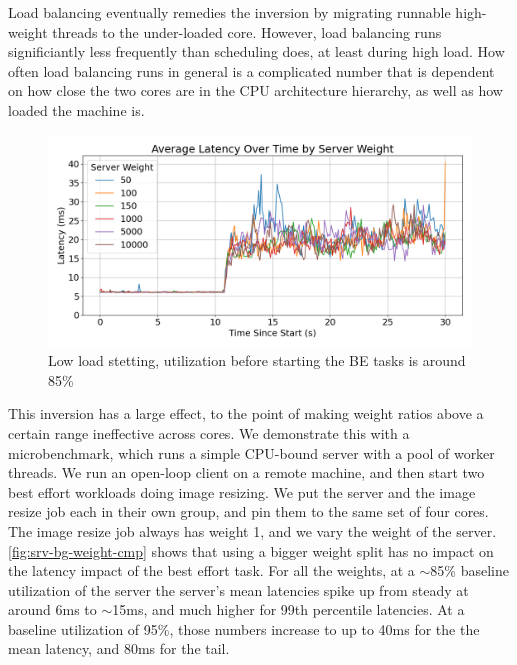 Load balancing eventually remedies the inversion by migrating runnable
high-weight threads to the under-loaded core. However, load balancing runs
significiantly less frequently than scheduling does, at least during high load.
How often load balancing runs in general is a complicated number that is
dependent on how close the two cores are in the CPU architecture hierarchy, as
well as how loaded the machine is.

\begin{figure}[t]
    \centering
    \includegraphics[width=\columnwidth]{graphs/srv-bg-weight-cmp-low.png}
    \caption{Low load stetting, utilization before starting the BE tasks is
        around 85\%}\label{fig:srv-bg-weight-cmp}
\end{figure}

This inversion
has a large effect, to the point of making weight ratios above a certain range
ineffective across cores. We demonstrate this with a microbenchmark, which runs
a simple CPU-bound server with a pool of worker threads. We run an open-loop
client on a remote machine, and then start two best effort workloads doing image
resizing. We put the server and the image resize job each in their own
\cgroups{} group, and pin them to the same set of four cores. The image resize
job always has weight 1, and we vary the weight of the server.
\autoref{fig:srv-bg-weight-cmp} shows that using a bigger weight split has no
impact on the latency impact of the best effort task. For all the weights, at a
$\sim$85\% baseline utilization of the server the server's mean latencies spike
up from steady at around 6ms to $\sim$15ms, and much higher for 99th percentile
latencies. At a baseline utilization of 95\%, those numbers increase to up to
40ms for the the mean latency, and 80ms for the tail.




